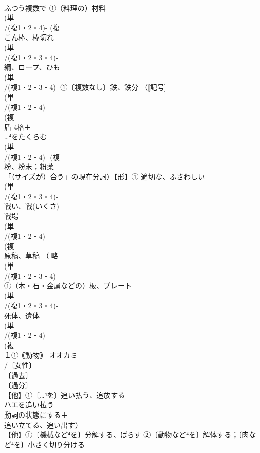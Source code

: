 \documentclass[8pt]{extreport}
\begin{document}
\begin{CJK}{UTF8}{min}
\\	ふつう複数で ①（料理の）材料 
\\	(単
\\	/(複1・2・4)- (複
\\	こん棒、棒切れ
\\	(単
\\	/(複1・2・3・4)‐
\\	綱、ロープ、ひも 
\\	(単
\\	/(複1・2・3・4)‐ ①〔複数なし〕鉄、鉄分 （[記号]
\\	(単
\\	/(複1・2・4)-
\\	(複
\\	盾 4格＋
\\	…⁴をたくらむ 
\\	(単
\\	/(複1・2・4)- (複
\\	粉、粉末；粉薬 
\\	「（サイズが）合う」の現在分詞）【形】① 適切な、ふさわしい
\\	(単
\\	/(複1・2・3・4)‐
\\	戦い、戦(いくさ) 
\\	戦場
\\	(単
\\	/(複1・2・4)-
\\	(複
\\	原稿、草稿 （[略]
\\	(単
\\	/(複1・2・3・4)‐
\\	①（木・石・金属などの）板、プレート 
\\	(単
\\	/(複1・2・3・4)‐
\\	死体、遺体 
\\	(単
\\	/(複1・2・4)
\\	(複
\\	１①｟動物｠ オオカミ 
\\	/〔女性〕
\\	〔過去〕
\\	〔過分〕
\\	【他】①〔…⁴を〕追い払う、追放する 
\\	ハエを追い払う 
\\	動詞の状態にする＋
\\	追い立てる、追い出す）
\\	【他】①〔機械など⁴を〕分解する、ばらす ②〔動物など⁴を〕解体する；〔肉など⁴を〕小さく切り分ける

\end{CJK}
\end{document}
